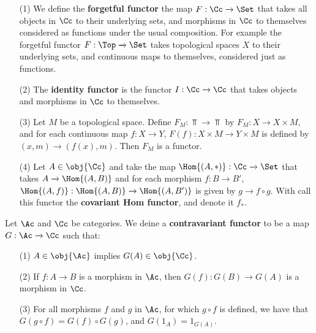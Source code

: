 \begin{example}\label{1.3}
    \begin{enumerate}
        \item[(1)] We define the \textbf{forgetful functor} the map $F:\Cc
            \xrightarrow{} \Set$ that takes all objects in $\Cc$ to their
            underlying sets, and morphisms in $\Cc$ to themselves considered as
            functions under the usual composition. For example the forgetful
            functor  $F:\Top \xrightarrow{} \Set$ takes topological spaces  $X$
            to their underlying sets, and continuous maps to themselves,
            considered just as functions.

        \item[(2)] The \textbf{identity functor} is the functor $I:\Cc
            \xrightarrow{} \Cc$ that takes objects and morphisms in $\Cc$ to
            themselves.

        \item[(3)] Let $M$ be a topological space. Define $F_M:\Top
            \xrightarrow{} \Top$ by $F_M:X \xrightarrow{} X \times M$, and for
            each continuous map $f:X \xrightarrow{} Y$, $F(f):X \times M
            \xrightarrow{} Y \times M$ is defined by $(x,m) \xrightarrow{}
            (f(x),m)$. Then $F_M$ is a functor.

        \item[(4)] Let $A \in \obj{\Cc}$ and take the map $\Hom{(A,\ast)}:\Cc
            \xrightarrow{} \Set$ that takes $A \xrightarrow{} \Hom{(A,B)}$ and
            for each morphism $f:B \xrightarrow{} B'$, $\Hom{(A,f)}:\Hom{(A,B)}
            \xrightarrow{} \Hom{(A,B')}$ is given by $g \xrightarrow{} f \circ
            g$. With call this functor the \textbf{covariant Hom functor}, and
            denote it $f_*$.
    \end{enumerate}
\end{example}

\begin{definition}
    Let $\Ac$ and  $\Cc$ be categories. We deine a \textbf{contravariant functor}
    to be a map $G:\Ac \xrightarrow{} \Cc$ such that:
    \begin{enumerate}
        \item[(1)] $A \in \obj{\Ac}$ implies $G(A) \in \obj{\Cc}$.

        \item[(2)] If $f:A \xrightarrow{} B$ is a morphism in $\Ac$, then
            $G(f):G(B) \xrightarrow{} G(A)$ is a morphism in $\Cc$.

        \item[(3)] For all morphisms $f$ and  $g$ in  $\Ac$, for which  $g \circ
            f$ is defined, we have that  $G(g \circ f)=G(f) \circ G(g)$, and
            $G(1_A)=1_{G(A)}$.
    \end{enumerate}
\end{definition}

